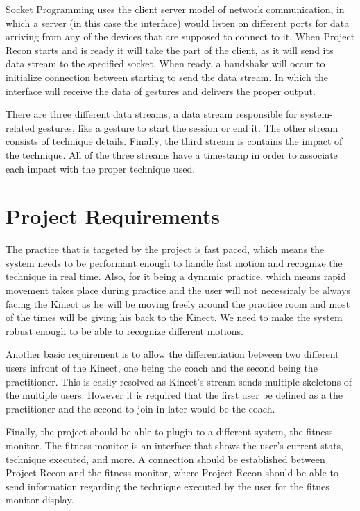 Socket Programming uses the client server model of network communication, in which a server (in this case the interface) would listen on different ports for data arriving from any of the devices that are supposed to connect to it. When Project Recon starts and is ready it will take the part of the client, as it will send its data stream to the specified socket. When ready, a handshake will occur to initialize connection between starting to send the data stream. In which the interface will receive the data of gestures and delivers the proper output.

There are three different data streams, a data stream responsible for system-related gestures, like a gesture to start the session or end it. The other stream consists of technique details. Finally, the third stream is contains the impact of the technique. All of the three streams have a timestamp in order to associate each impact with the proper technique used.


\section{Project Requirements}
The practice that is targeted by the project is fast paced, which means the system needs to be performant enough to handle fast motion and recognize the technique in real time. Also, for it being a dynamic practice, which means rapid movement takes place during practice and the user will not necessiraly be always facing the Kinect as he will be moving freely around the practice room and most of the times will be giving his back to the Kinect. We need to make the system robust enough to be able to recognize different motions.

Another basic requirement is to allow the differentiation between two different users infront of the Kinect, one being the coach and the second being the practitioner. This is easily resolved as Kinect's stream sends multiple skeletons of the multiple users. However it is required that the first user be defined as a the practitioner and the second to join in later would be the coach.

Finally, the project should be able to plugin to a different system, the fitness monitor. The fitness monitor is an interface that shows the user's current stats, technique executed, and more. A connection should be established between Project Recon and the fitness monitor, where Project Recon should be able to send information regarding the technique executed by the user for the fitnes monitor display.